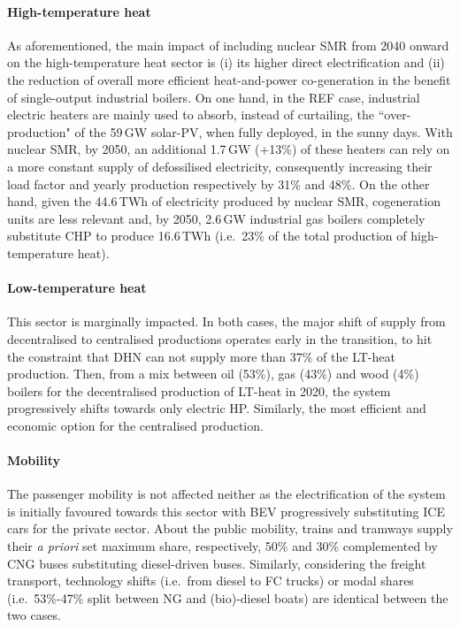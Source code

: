\documentclass[11pt,twoside,a4paper,english]{article}
\def\ie{i.e.\ }
\begin{document}
\paragraph*{High-temperature heat}
As aforementioned, the main impact of including nuclear SMR from 2040 onward on the high-temperature heat sector is (i) its higher direct electrification and (ii) the reduction of overall more efficient heat-and-power co-generation in the benefit of single-output industrial boilers. On one hand, in the REF case, industrial electric heaters are mainly used to absorb, instead of curtailing, the ``over-production" of the 59\,GW solar-PV, when fully deployed, in the sunny days. With nuclear SMR, by 2050, an additional 1.7\,GW (+13\%) of these heaters can rely on a more constant supply of defossilised electricity, consequently increasing their load factor and yearly production respectively by 31\% and 48\%. On the other hand, given the 44.6\,TWh of electricity produced by nuclear SMR, cogeneration units are less relevant and, by 2050, 2.6\,GW industrial gas boilers completely substitute \gls{CHP} to produce 16.6\,TWh (\ie 23\% of the total production of high-temperature heat).

\paragraph*{Low-temperature heat}
This sector is marginally impacted. In both cases, the major shift of supply from decentralised to centralised productions operates early in the transition, to hit the constraint that \gls{DHN} can not supply more than 37\% of the \gls{LT}-heat production. Then, from a mix between oil (53\%), gas (43\%) and wood (4\%) boilers for the decentralised production of \gls{LT}-heat in 2020, the system progressively shifts towards only electric \gls{HP}. Similarly, the most efficient and economic option for the centralised production.

\paragraph*{Mobility}
The passenger mobility is not affected neither as the electrification of the system is initially favoured towards this sector with \gls{BEV} progressively substituting \gls{ICE} cars for the private sector. About the public mobility, trains and tramways supply their \textit{a priori} set maximum share, respectively, 50\% and 30\% complemented by \gls{CNG} buses substituting diesel-driven buses. Similarly, considering the freight transport, technology shifts (\ie from diesel to \gls{FC} trucks) or modal shares (\ie 53\%-47\% split between \gls{NG} and (bio)-diesel boats) are identical between the two cases.
\end{document}
